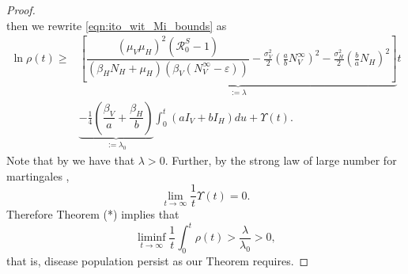 \begin{proof}
$$    $$
    then we rewrite \eqref{eqn:ito_wit_Mi_bounds} as
    \begin{equation} \label{eqn:ito_wit_Mi_bounds_new_notation}
        \begin{aligned}
            \ln \rho(t) 
            \geq &
                \underbrace{
                    \left[
                        \dfrac{
                            (\mu_V \mu_H) ^ 2 (\mathcal{R}_0 ^ S - 1)
                        }{
                            (\beta_H N_H + \mu_H) 
                            (\beta_V \left(N_V ^ {\infty} -\varepsilon\right))
                        }
                        -
                        \frac{\sigma_V ^ 2}{2}
                        \left(
                            \frac{a}{b} N_V ^ \infty
                        \right) ^2
                        -
                        \frac{\sigma_H ^ 2}{2}
                        \left(
                            \frac{b}{a}
                            N_H
                        \right) ^ 2
                    \right]
                }_{:= \lambda}
                t
            \\
            &
            \underbrace{
                -\frac{1}{4}
                \left(
                    \dfrac{\beta_V}{a}
                    +
                    \dfrac{\beta_H}{b}
                \right)
            }_{:= \lambda_0}
            \int_{0} ^ t
                \left(
                    a I_V + b I_H
                \right)
                du
            +
            \varUpsilon(t).
        \end{aligned}
    \end{equation}
    Note that by  we have that $\lambda > 0$.
    Further, by the strong law of large number for martingales 
    \citet[p. 12]{Mao2007},
    $$
        \lim_{t \to \infty}
            \frac{1}{t}
            \varUpsilon (t) =0.
    $$
    Therefore Theorem (*) implies that
    $$
        \liminf_{t \to \infty} 
            \frac{1}{t}\int_0 ^ t 
                \rho(t) 
            > \dfrac{ \lambda }{ \lambda_0} >0,
    $$
    that is, disease population persist as our Theorem requires.
\end{proof}
%